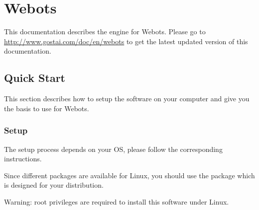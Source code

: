 \newenvironment{attribute}[4]
{
  \item \lstinline|#1|
    \begin{description}
    \item[Permissions] #2.
    \item[Type] #3.
      \ifx#4\empty\else
    \item[Range] #4.
      \fi
    \item[Description]
}{
    \end{description}
}

\chapter{Webots}
\label{sec:webots}

This documentation describes the \urbi engine for Webots.  Please go to
\url{http://www.gostai.com/doc/en/webots} to get the latest updated
version of this documentation.

\section{Quick Start}

This section describes how to setup the software on your computer and
give you the basis to use \urbi for Webots.


\subsection{Setup}

The setup process depends on your OS, please follow the corresponding
instructions.

Since different packages are available for Linux, you should use the
package which is designed for your distribution.

Warning: root privileges are required to install this software under
Linux.

